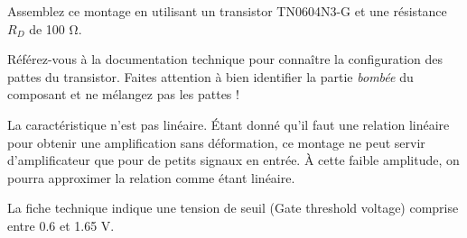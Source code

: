 \documentclass{../template/labo}
\begin{document}
\begin{manip}

Assemblez ce montage en utilisant un transistor TN0604N3-G et une résistance $R_D$ de 100 $\si{\ohm}$.
\begin{astuce}
	Référez-vous à la documentation technique pour connaître la configuration des pattes du transistor. Faites attention à bien identifier la partie \textit{bombée} du composant et ne mélangez pas les pattes !
\end{astuce}

{
}
\end{manip}

\begin{predet}
{
La caractéristique n'est pas linéaire. Étant donné qu'il faut une relation linéaire pour obtenir une amplification sans déformation, ce montage ne peut servir d'amplificateur que pour de petits signaux en entrée. À cette faible amplitude, on pourra approximer la relation comme étant linéaire.
}
\end{predet}

\begin{predet}
{
	La fiche technique indique une tension de seuil (Gate threshold voltage) comprise entre 0.6 et 1.65 $\si{\volt}$.
}
\end{predet}
\end{document}
